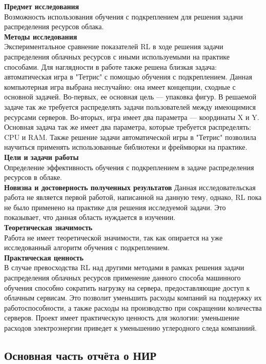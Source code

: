 \documentclass{article}
\begin{document}
\textbf{Предмет исследования}\\
Возможность использования обучения с подкреплением для решения задачи распределения ресурсов облака.\\
\textbf{Методы исследования}\\
Экспериментальное сравнение показателей RL в ходе решения задачи распределения облачных ресурсов с иными используемыми на практике способами. Для наглядности в работе также решена близкая задача: автоматическая игра в "Тетрис" с помощью обучения с подкреплением.  Данная компьютерная игра выбрана неслучайно: она имеет концепции, сходные с основной задачей. Во-первых, ее основная цель — упаковка фигур. В решаемой задаче так же требуется распределять задачи пользователей между имеющимися ресурсами серверов. Во-вторых, игра имеет два параметра — координаты X и Y. Основная задача так же имеет два параметра, которые требуется распределять: CPU и RAM. Также решение задачи автоматической игры в "Тетрис" позволила научиться применять использованные библиотеки и фреймворки на практике.\\
\textbf{Цели и задачи работы}\\
Определение эффективность обучения с подкреплением в задаче распределения ресурсов в облаке.\\
\textbf{Новизна и достоверность полученных результатов}
Данная исследовательская работа не является первой работой, написанной на данную тему, однако, RL пока не было применено на практике для решения исследуемой задачи. Это показывает, что данная область нуждается в изучении.\\
\textbf{Теоретическая значимость}\\
Работа не имеет теоретической значимости, так как опирается на уже исследованный алгоритм обучения с подкреплением.\\
\textbf{Практическая ценность}\\
В случае превосходства RL над другими методами в рамках решения задачи распределения облачных ресурсов применение данного способа машинного обучения способно сократить нагрузку на сервера, предоставляющие доступ к облачным сервисам. Это позволит уменьшить расходы компаний на поддержку их работоспособности, а также расходы на производство при сокращении количества серверов. Проект имеет практическую ценность для экологии: уменьшение расходов электроэнергии приведет к уменьшению углеродного следа компаниий.	\\
\newpage
\begin{center}
\section {Основная часть отчёта о НИР}
\end{center}
\end{document}

